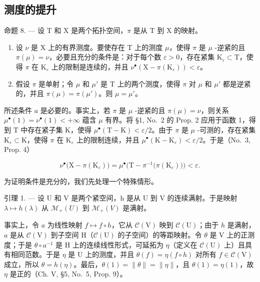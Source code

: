 \subsection{测度的提升}

命题 8. --- 设 T 和 X 是两个拓扑空间，\(\pi\) 是从 T 到 X 的映射。

\begin{enumerate}
\def\labelenumi{\alph{enumi})}
\item
  设 \(\nu\) 是 X 上的有界测度。要使存在 T 上的测度 \(\mu\)，使得 \(\pi\) 是 \(\mu\) -逆紧的且 \(\pi(\mu) = \nu\)，必要且充分的条件是：对于每个数 \(\varepsilon > 0\)，存在紧集 \(\mathrm{K}_{\varepsilon} \subset \mathrm{T}\)，使得 \(\pi\) 在 \(\mathrm{K}_{\varepsilon}\) 上的限制是连续的，并且 \(\nu^{\bullet}(\mathrm{X} - \pi(\mathrm{K}_{\varepsilon})) < \varepsilon\)。
\item
  假设 \(\pi\) 是单射；令 \(\mu\) 和 \(\mu'\) 是 T 上的两个测度，使得 \(\pi\) 对 \(\mu\) 和 \(\mu'\) 都是逆紧的，并且 \(\pi(\mu) = \pi(\mu')\)。则 \(\mu = \mu'\)。
\end{enumerate}

所述条件 \(a\) 是必要的。事实上，若 \(\pi\) 是 \(\mu\) -逆紧的且 \(\pi(\mu) = \nu\)，则关系 \(\mu^{\bullet}(1) = \nu^{\bullet}(1) < +\infty\) 蕴含 \(\mu\) 有界。将 §1, No.~2 的 Prop. 2 应用于函数 1，得到 T 中存在紧子集 K，使得 \(\mu^{\bullet}(\mathrm{T} - \mathrm{K}) < \varepsilon/2\)。由于 \(\pi\) 是 \(\mu\) -可测的，存在紧集 \(\mathrm{K}_{\varepsilon} \subset \mathrm{K}\)，使得 \(\pi\) 在 \(\mathrm{K}_{\varepsilon}\) 上的限制连续，并且 \(\mu^{\bullet}(\mathrm{K} - \mathrm{K}_{\varepsilon}) < \varepsilon/2\)。于是（No.~3, Prop. 4）

\[
\nu^ {\bullet} \big (\mathrm{X} - \pi (\mathrm{K} _ {\varepsilon}) \big) = \mu^ {\bullet} \big (\mathrm{T} - \pi^{-1} \big (\pi (\mathrm{K} _ {\varepsilon}) \big) \big) <   \varepsilon .
\]

为证明条件是充分的，我们先处理一个特殊情形。

引理 1. --- 设 U 和 V 是两个紧空间，h 是从 U 到 V 的连续满射。于是映射 \(\lambda \mapsto h(\lambda)\) 从 \(\mathcal{M}_{+}(U)\) 到 \(\mathcal{M}_{+}(V)\) 是满射。

事实上，令 \(a\) 为线性映射 \(f \mapsto f \circ h\)，它从 \(\mathcal{C}(\mathrm{V})\) 映到 \(\mathcal{C}(\mathrm{U})\)；由于 \(h\) 是满射，\(a\) 是从 \(\mathcal{C}(\mathrm{V})\) 到子空间 \(\mathrm{H}\)（\(\mathcal{C}(\mathrm{U})\) 的子空间）的等距映射。令 \(\theta\) 是 \(\mathrm{V}\) 上的正测度；于是 \(\theta \circ a^{-1}\) 是 \(\mathrm{H}\) 上的连续线性形式，可延拓为 \(\eta\)（定义在 \(\mathcal{C}(\mathrm{U})\) 上）且具有相同范数。于是 \(\eta\) 是 \(\mathrm{U}\) 上的测度，并且 \(\theta(f) = \eta(f \circ h)\) 对所有 \(f \in \mathcal{C}(\mathrm{V})\) 成立，所以 \(\theta = h(\eta)\)。最后，\(\theta(1) = \| \theta \| = \| \eta \|\)，且 \(\theta(1) = \eta(1)\)，故 \(\eta\) 是正的（Ch. V, §5, No.~5, Prop. 9）。

